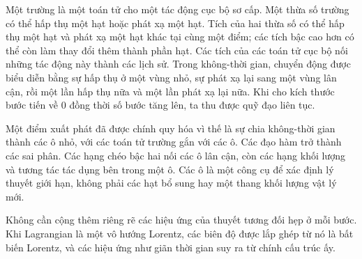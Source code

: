 Một trường là một toán tử cho một tác động cục bộ sơ cấp. Một thừa số trường có thể hấp thụ một hạt hoặc phát xạ một hạt. Tích của hai thừa số có thể hấp thụ một hạt và phát xạ một hạt khác tại cùng một điểm; các tích bậc cao hơn có thể còn làm thay đổi thêm thành phần hạt. Các tích của các toán tử cục bộ nối những tác động này thành các lịch sử. Trong không-thời gian, chuyển động được biểu diễn bằng sự hấp thụ ở một vùng nhỏ, sự phát xạ lại sang một vùng lân cận, rồi một lần hấp thụ nữa và một lần phát xạ lại nữa. Khi cho kích thước bước tiến về 0 đồng thời số bước tăng lên, ta thu được quỹ đạo liên tục.

\begin{classroomqa}
\end{classroomqa}

Một điểm xuất phát đã được chính quy hóa vì thế là sự chia không-thời gian thành các ô nhỏ, với các toán tử trường gắn với các ô. Các đạo hàm trở thành các sai phân. Các hạng chéo bậc hai nối các ô lân cận, còn các hạng khối lượng và tương tác tác dụng bên trong một ô. Các ô là một công cụ để xác định lý thuyết giới hạn, không phải các hạt bổ sung hay một thang khối lượng vật lý mới.

Không cần cộng thêm riêng rẽ các hiệu ứng của thuyết tương đối hẹp ở mỗi bước. Khi Lagrangian là một vô hướng Lorentz, các biên độ được lắp ghép từ nó là bất biến Lorentz, và các hiệu ứng như giãn thời gian suy ra từ chính cấu trúc ấy.

\begin{classroomqa}
\end{classroomqa}

